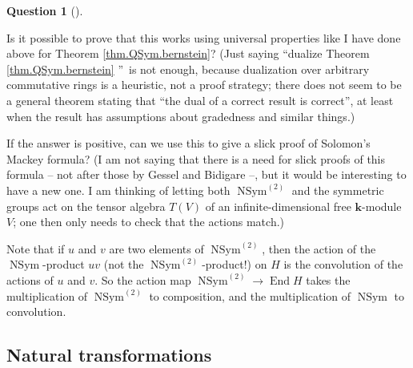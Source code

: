 \documentclass
[numbers=enddot,12pt,final,onecolumn,notitlepage,abstracton]{scrartcl}%
\theoremstyle{definition}
\newtheorem{quest}[theo]{Question}
\newenvironment{question}[1][]
{\begin{quest}[#1]\begin{leftbar}}
{\end{leftbar}\end{quest}}
\newenvironment{question}[1][Question]{\noindent\textbf{#1.} }{\ \rule{0.5em}{0.5em}}
\begin{document}
\begin{question}
\label{quest.NSym}Is it possible to prove that this works using universal
properties like I have done above for Theorem \ref{thm.QSym.bernstein}? (Just
saying \textquotedblleft dualize Theorem \ref{thm.QSym.bernstein}%
\textquotedblright\ is not enough, because dualization over arbitrary
commutative rings is a heuristic, not a proof strategy; there does not seem to
be a general theorem stating that \textquotedblleft the dual of a correct
result is correct\textquotedblright, at least when the result has assumptions
about gradedness and similar things.)

If the answer is positive, can we use this to give a slick proof of Solomon's
Mackey formula? (I am not saying that there is a need for slick proofs of this
formula -- not after those by Gessel and Bidigare --, but it would be
interesting to have a new one. I am thinking of letting both
$\operatorname*{NSym}^{\left(  2\right)  }$ and the symmetric groups act on
the tensor algebra $T\left(  V\right)  $ of an infinite-dimensional free
$\mathbf{k}$-module $V$; one then only needs to check that the actions match.)
\end{question}

Note that if $u$ and $v$ are two elements of $\operatorname*{NSym}%
\nolimits^{\left(  2\right)  }$, then the action of the $\operatorname*{NSym}%
$-product $uv$ (not the $\operatorname*{NSym}\nolimits^{\left(  2\right)  }%
$-product!) on $H$ is the convolution of the actions of $u$ and $v$. So the
action map $\operatorname*{NSym}\nolimits^{\left(  2\right)  }\rightarrow
\operatorname*{End}H$ takes the multiplication of $\operatorname*{NSym}%
\nolimits^{\left(  2\right)  }$ to composition, and the multiplication of
$\operatorname*{NSym}$ to convolution.

\subsection{Natural transformations}
\end{document}
